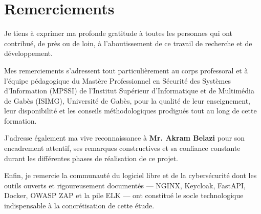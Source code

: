 \section*{Remerciements}
Je tiens à exprimer ma profonde gratitude à toutes les personnes qui ont contribué, de près ou de loin, à l'aboutissement de ce travail de recherche et de développement.

Mes remerciements s'adressent tout particulièrement au corps professoral et à l'équipe pédagogique du Mastère Professionnel en Sécurité des Systèmes d'Information (MPSSI) de l'Institut Supérieur d'Informatique et de Multimédia de Gabès (ISIMG), Université de Gabès, pour la qualité de leur enseignement, leur disponibilité et les conseils méthodologiques prodigués tout au long de cette formation.

J'adresse également ma vive reconnaissance à \textbf{Mr. Akram Belazi} pour son encadrement attentif, ses remarques constructives et sa confiance constante durant les différentes phases de réalisation de ce projet.

Enfin, je remercie la communauté du logiciel libre et de la cybersécurité dont les outils ouverts et rigoureusement documentés --- NGINX, Keycloak, FastAPI, Docker, OWASP ZAP et la pile ELK --- ont constitué le socle technologique indispensable à la concrétisation de cette étude.